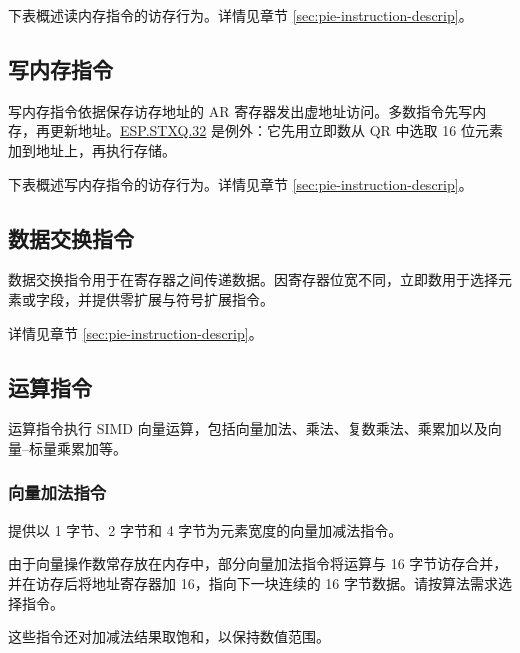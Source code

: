 \documentclass[main\_\_CN.tex]{subfiles}
\begin{document}
下表概述读内存指令的访存行为。详情见章节 \ref{sec:pie-instruction-descrip}。
\newpage


\subsection{写内存指令}
\label{sec:pie-write-instructions}

写内存指令依据保存访存地址的 AR 寄存器发出虚地址访问。多数指令先写内存，再更新地址。\hyperref[instruction:ESPSTXQ32]{ESP.STXQ.32} 是例外：它先用立即数从 QR 中选取 16 位元素加到地址上，再执行存储。


下表概述写内存指令的访存行为。详情见章节 \ref{sec:pie-instruction-descrip}。



\subsection{数据交换指令}
\label{sec:pie-data-exchange-instructions}

数据交换指令用于在寄存器之间传递数据。因寄存器位宽不同，立即数用于选择元素或字段，并提供零扩展与符号扩展指令。

详情见章节 \ref{sec:pie-instruction-descrip}。




\subsection{运算指令}
\label{sec:pie-arithmetic-instructions}

运算指令执行 SIMD 向量运算，包括向量加法、乘法、复数乘法、乘累加以及向量–标量乘累加等。

\subsubsection{向量加法指令}

\chipname{} 提供以 1 字节、2 字节和 4 字节为元素宽度的向量加减法指令。

由于向量操作数常存放在内存中，部分向量加法指令将运算与 16 字节访存合并，并在访存后将地址寄存器加 16，指向下一块连续的 16 字节数据。请按算法需求选择指令。

这些指令还对加减法结果取饱和，以保持数值范围。


\end{document}
